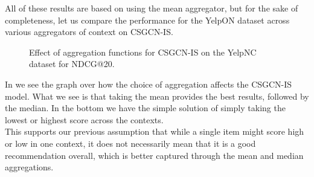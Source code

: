 All of these results are based on using the mean aggregator, but for the sake of completeness, let us compare the performance for the YelpON dataset across various aggregators of context on CSGCN-IS.
\begin{figure}
    \caption{Effect of aggregation functions for CSGCN-IS on the YelpNC dataset for NDCG@20.}
    \label{fig:aggregation_effect}
\end{figure}
In  we see the graph over how the choice of aggregation affects the CSGCN-IS model.
What we see is that taking the mean provides the best results, followed by the median.
In the bottom we have the simple solution of simply taking the lowest or highest score across the contexts.\\
This supports our previous assumption that while a single item might score high or low in one context, it does not necessarily mean that it is a good recommendation overall, which is better captured through the mean and median aggregations.\\
